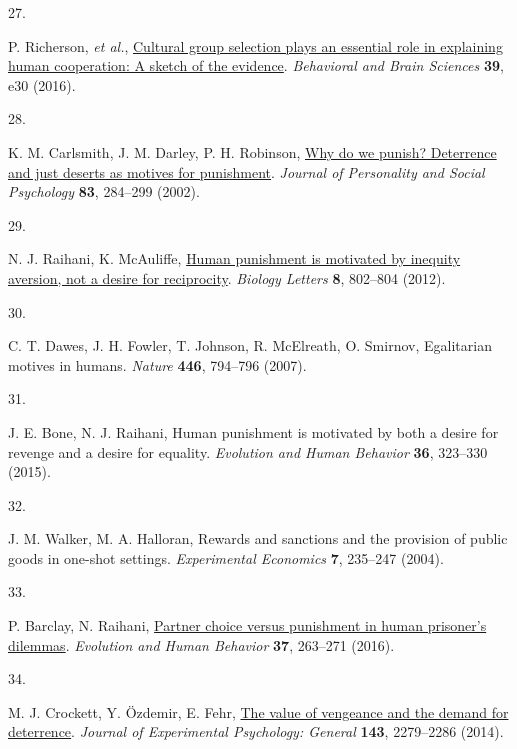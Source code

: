 \documentclass[
  man, donotrepeattitle,floatsintext]{apa6}
\newlength{\cslhangindent}
\newlength{\csllabelwidth}
\newlength{\cslentryspacingunit} %
\newenvironment{CSLReferences}[2] %
 {%
  \setlength{\parindent}{0pt}
  \ifodd #1
  \let\oldpar\par
  \def\par{\hangindent=\cslhangindent\oldpar}
  \fi
  \setlength{\parskip}{#2\cslentryspacingunit}
 }%
 {}
\newcommand{\CSLLeftMargin}[1]{\parbox[t]{\csllabelwidth}{#1}}
\newcommand{\CSLRightInline}[1]{\parbox[t]{\linewidth - \csllabelwidth}{#1}\break}
\begin{document}
\begin{CSLReferences}{0}{0}
\leavevmode{}%
\CSLLeftMargin{27. }%
\CSLRightInline{P. Richerson, \emph{et al.}, \href{https://doi.org/10.1017/S0140525X1400106X}{Cultural group selection plays an essential role in explaining human cooperation: A sketch of the evidence}. \emph{Behavioral and Brain Sciences} \textbf{39}, e30 (2016).}

\leavevmode{}%
\CSLLeftMargin{28. }%
\CSLRightInline{K. M. Carlsmith, J. M. Darley, P. H. Robinson, \href{https://doi.org/10.1037/0022-3514.83.2.284}{Why do we punish? Deterrence and just deserts as motives for punishment}. \emph{Journal of Personality and Social Psychology} \textbf{83}, 284--299 (2002).}

\leavevmode{}%
\CSLLeftMargin{29. }%
\CSLRightInline{N. J. Raihani, K. McAuliffe, \href{https://doi.org/10.1098/rsbl.2012.0470}{Human punishment is motivated by inequity aversion, not a desire for reciprocity}. \emph{Biology Letters} \textbf{8}, 802--804 (2012).}

\leavevmode{}%
\CSLLeftMargin{30. }%
\CSLRightInline{C. T. Dawes, J. H. Fowler, T. Johnson, R. McElreath, O. Smirnov, Egalitarian motives in humans. \emph{Nature} \textbf{446}, 794--796 (2007).}

\leavevmode{}%
\CSLLeftMargin{31. }%
\CSLRightInline{J. E. Bone, N. J. Raihani, Human punishment is motivated by both a desire for revenge and a desire for equality. \emph{Evolution and Human Behavior} \textbf{36}, 323--330 (2015).}

\leavevmode{}%
\CSLLeftMargin{32. }%
\CSLRightInline{J. M. Walker, M. A. Halloran, Rewards and sanctions and the provision of public goods in one-shot settings. \emph{Experimental Economics} \textbf{7}, 235--247 (2004).}

\leavevmode{}%
\CSLLeftMargin{33. }%
\CSLRightInline{P. Barclay, N. Raihani, \href{https://doi.org/10.1016/j.evolhumbehav.2015.12.004}{Partner choice versus punishment in human prisoner's dilemmas}. \emph{Evolution and Human Behavior} \textbf{37}, 263--271 (2016).}

\leavevmode{}%
\CSLLeftMargin{34. }%
\CSLRightInline{M. J. Crockett, Y. Özdemir, E. Fehr, \href{https://doi.org/10.1037/xge0000018}{The value of vengeance and the demand for deterrence}. \emph{Journal of Experimental Psychology: General} \textbf{143}, 2279--2286 (2014).}


\end{CSLReferences}
\end{document}
